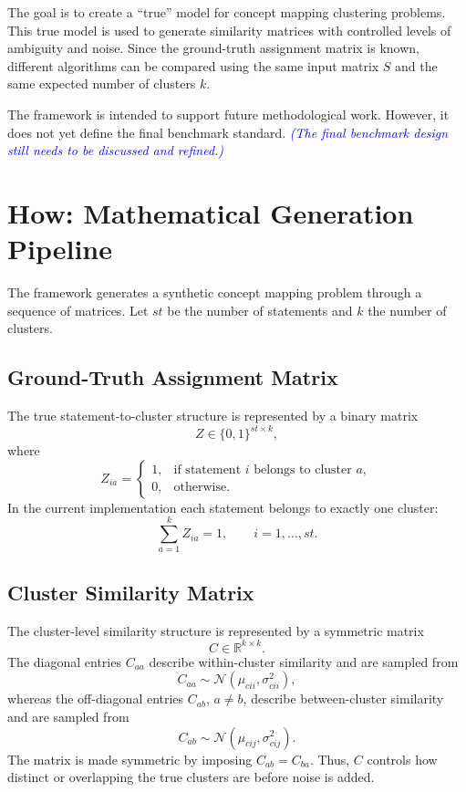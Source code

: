 \documentclass[11pt,a4paper]{article}
\newcommand{\discussionnote}[1]{\textcolor{blue}{\scriptsize\emph{(#1)}}}
\begin{document}
The goal is to create a ``true'' model for concept mapping clustering problems. This true model is used to generate similarity matrices with controlled levels of ambiguity and noise. Since the ground-truth assignment matrix is known, different algorithms can be compared using the same input matrix \(S\) and the same expected number of clusters \(k\).

The framework is intended to support future methodological work. However, it does not yet define the final benchmark standard. \discussionnote{The final benchmark design still needs to be discussed and refined.}

\section{How: Mathematical Generation Pipeline}

The framework generates a synthetic concept mapping problem through a sequence of matrices. Let \(st\) be the number of statements and \(k\) the number of clusters.

\subsection{Ground-Truth Assignment Matrix}

The true statement-to-cluster structure is represented by a binary matrix
\[
Z \in \{0,1\}^{st \times k},
\]
where
\[
Z_{ia} =
\begin{cases}
1, & \text{if statement } i \text{ belongs to cluster } a,\\
0, & \text{otherwise.}
\end{cases}
\]
In the current implementation each statement belongs to exactly one cluster:
\[
\sum_{a=1}^{k} Z_{ia}=1, \qquad i=1,\ldots,st.
\]

\subsection{Cluster Similarity Matrix}

The cluster-level similarity structure is represented by a symmetric matrix
\[
C \in \mathbb{R}^{k \times k}.
\]
The diagonal entries \(C_{aa}\) describe within-cluster similarity and are sampled from
\[
C_{aa} \sim \mathcal{N}(\mu_{cii},\sigma_{cii}^{2}),
\]
whereas the off-diagonal entries \(C_{ab}\), \(a \neq b\), describe between-cluster similarity and are sampled from
\[
C_{ab} \sim \mathcal{N}(\mu_{cij},\sigma_{cij}^{2}).
\]
The matrix is made symmetric by imposing \(C_{ab}=C_{ba}\). Thus, \(C\) controls how distinct or overlapping the true clusters are before noise is added.
\end{document}
